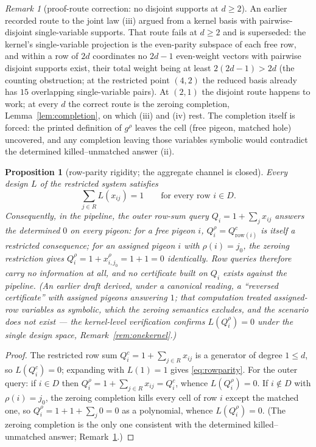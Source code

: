 \documentclass[11pt]{article}
\newtheorem{proposition}[theorem]{Proposition}
\theoremstyle{definition}
\theoremstyle{remark}
\newtheorem{remark}[theorem]{Remark}
\begin{document}
\begin{remark}[proof-route correction: no disjoint supports at
$d\ge2$]\label{rem:proofroute}
An earlier recorded route to the joint law (iii) argued from a kernel
basis with pairwise-disjoint single-variable supports.  That route
fails at $d\ge2$ and is superseded: the kernel's single-variable
projection is the even-parity subspace of each free row, and within a
row of $2d$ coordinates no $2d-1$ even-weight vectors with pairwise
disjoint supports exist, their total weight being at least
$2(2d-1)>2d$ (the counting obstruction; at the restricted point
$(4,2)$ the reduced basis already has $15$ overlapping single-variable
pairs).  At $(2,1)$ the disjoint route happens to work; at every $d$
the correct route is the zeroing completion, Lemma~\ref{lem:completion},
on which (iii) and (iv) rest.  The completion itself is forced: the
printed definition of $g^\rho$ leaves the cell (free pigeon, matched
hole) uncovered, and any completion leaving those variables symbolic
would contradict the determined killed--unmatched answer (ii).
\end{remark}

\begin{proposition}[row-parity rigidity; the aggregate channel is
closed]\label{prop:rigidity}
Every design $L$ of the restricted system satisfies
\begin{equation}\label{eq:rowparity}
\sum_{j\in R}L(x_{ij})=1\qquad\text{for every row } i\in D .
\end{equation}
Consequently, in the pipeline, the outer row-sum query
$Q_i=1+\sum_jx_{ij}$ answers the determined $0$ on \emph{every} pigeon:
for a free pigeon $i$, $Q_i^{\rho}=Q^{c}_{\mathrm{row}(i)}$ is itself a
restricted consequence; for an assigned pigeon $i$ with $\rho(i)=j_0$,
the zeroing restriction gives
$Q_i^{\rho}=1+x_{i,j_0}^{\rho}=1+1=0$ identically.  Row queries
therefore carry no information at all, and no certificate built on
$Q_i$ exists against the pipeline.  (An earlier draft derived, under a
canonical reading, a ``reversed certificate'' with assigned pigeons
answering $1$; that computation treated assigned-row variables as
symbolic, which the zeroing semantics excludes, and the scenario does
not exist --- the kernel-level verification confirms
$L(Q_i^{\rho})=0$ under the single design space,
Remark~\ref{rem:onekernel}.)
\end{proposition}

\begin{proof}
The restricted row sum $Q^c_i=1+\sum_{j\in R}x_{ij}$ is a generator of
degree $1\le d$, so $L(Q^c_i)=0$; expanding with $L(1)=1$ gives
\eqref{eq:rowparity}.  For the outer query: if $i\in D$ then
$Q_i^{\rho}=1+\sum_{j\in R}x_{ij}=Q^c_i$, whence $L(Q_i^{\rho})=0$.  If
$i\notin D$ with $\rho(i)=j_0$, the zeroing completion kills every cell
of row $i$ except the matched one, so
$Q_i^{\rho}=1+1+\sum_{j}0=0$ as a polynomial, whence
$L(Q_i^{\rho})=0$.  (The zeroing completion is the only one consistent
with the determined killed--unmatched answer;
Remark~\ref{rem:proofroute}.)
\end{proof}
\end{document}
